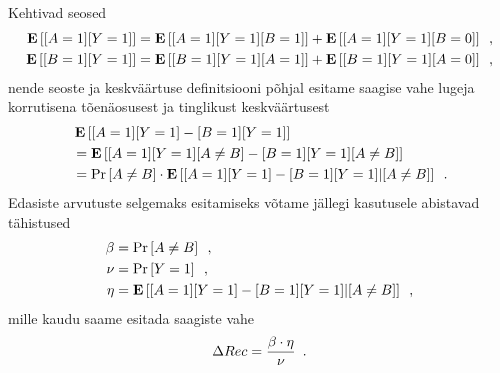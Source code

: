 Kehtivad seosed
\begin{align*}
    \operatorname*{\mathbf{E}}\left[[A = 1] [Y = 1]\right] &= \operatorname*{\mathbf{E}}\left[[A = 1] [Y = 1] [B = 1]\right] + \operatorname*{\mathbf{E}}\left[[A = 1] [Y = 1] [B = 0]\right] \enspace, \\
    \operatorname*{\mathbf{E}}\left[[B = 1] [Y = 1]\right] &= \operatorname*{\mathbf{E}}\left[[B = 1] [Y = 1] [A = 1]\right] + \operatorname*{\mathbf{E}}\left[[B = 1] [Y = 1] [A = 0]\right] \enspace,
\end{align*}
nende seoste ja keskväärtuse definitsiooni põhjal esitame saagise vahe lugeja korrutisena tõenäosusest ja tinglikust keskväärtusest
\begin{align*}
    &\operatorname*{\mathbf{E}}\left[[A = 1] [Y = 1] - [B = 1] [Y = 1]\right] \\
    &= \operatorname*{\mathbf{E}}\left[[A = 1] [Y = 1] [A \neq B] - [B = 1] [Y = 1] [A \neq B]\right] \\
    &= \Pr\left[A \neq B\right] \cdot \operatorname*{\mathbf{E}}\left[[A = 1] [Y = 1] - [B = 1] [Y = 1] | [A \neq B]\right] \enspace.
\end{align*}
Edasiste arvutuste selgemaks esitamiseks võtame jällegi kasutusele abistavad tähistused
\begin{align*}
    \beta &= \Pr\left[A \neq B\right] \enspace, \\
    \nu &= \Pr\left[Y = 1\right] \enspace, \\
    \eta &= \operatorname*{\mathbf{E}}\left[[A = 1] [Y = 1] - [B = 1] [Y = 1] | [A \neq B]\right] \enspace,
\end{align*}
mille kaudu saame esitada saagiste vahe
\begin{equation}
    \label{eq:saagis vahe tähistega}
    \Delta Rec = \frac{\beta \cdot \eta}{\nu} \enspace.
\end{equation}

